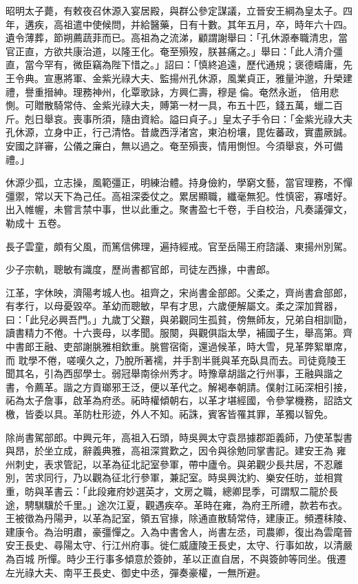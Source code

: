 \begin{pinyinscope}
 昭明太子薨，有敕夜召休源入宴居殿，與群公參定謀議，立晉安王綱為皇太子。四年，遘疾，高祖遣中使候問，并給醫藥，日有十數。其年五月，卒，時年六十四。遺令薄葬，節朔薦蔬菲而已。高祖為之流涕，顧謂謝舉曰：「孔休源奉職清忠，當官正直，方欲共康治道，以隆王化。奄至殞歿，朕甚痛之。」舉曰：「此人清介彊直，當今罕有，微臣竊為陛下惜之。」詔曰：「慎終追遠，歷代通規；褒德疇庸，先王令典。宣惠將軍、金紫光祿大夫、監揚州孔休源，風業貞正，雅量沖邈，升榮建禮，譽重搢紳。理務神州，化覃歌詠，方興仁壽，穆是倫。奄然永逝，
 倍用悲惻。可贈散騎常侍、金紫光祿大夫，賻第一材一具，布五十匹，錢五萬，蠟二百斤。剋日舉哀。喪事所須，隨由資給。謚曰貞子。」皇太子手令曰：「金紫光祿大夫孔休源，立身中正，行己清恪。昔歲西浮渚宮，東泊枌壤，毘佐蕃政，實盡厥誠。安國之詳審，公儀之廉白，無以過之。奄至殞喪，情用惻怛。今須舉哀，外可備禮。」



 休源少孤，立志操，風範彊正，明練治體。持身儉約，學窮文藝，當官理務，不憚彊禦，常以天下為己任。高祖深委仗之。累居顯職，纖毫無犯。性慎密，寡嗜好。出入帷幄，未嘗言禁中事，世以此重之。聚書盈七千卷，手自校治，凡奏議彈文，勒成十
 五卷。



 長子雲童，頗有父風，而篤信佛理，遍持經戒。官至岳陽王府諮議、東揚州別駕。



 少子宗軌，聰敏有識度，歷尚書都官郎，司徒左西掾，中書郎。



 江革，字休映，濟陽考城人也。祖齊之，宋尚書金部郎。父柔之，齊尚書倉部郎，有孝行，以母憂毀卒。革幼而聰敏，早有才思，六歲便解屬文。柔之深加賞器，曰：「此兒必興吾門。」九歲丁父艱，與弟觀同生孤貧，傍無師友，兄弟自相訓勖，讀書精力不倦。十六喪母，以孝聞。服闋，與觀俱詣太學，補國子生，舉高第。齊中書郎王融、吏部謝朓雅相欽重。朓嘗宿衛，還過候革，時大雪，見革弊絮單席，而
 耽學不倦，嗟嘆久之，乃脫所著襦，并手割半氈與革充臥具而去。司徒竟陵王聞其名，引為西邸學士。弱冠舉南徐州秀才。時豫章胡諧之行州事，王融與諧之書，令薦革。諧之方貢瑯邪王泛，便以革代之。解褐奉朝請。僕射江祏深相引接，祏為太子詹事，啟革為府丞。祏時權傾朝右，以革才堪經國，令參掌機務，詔誥文檄，皆委以具。革防杜形迹，外人不知。祏誅，賓客皆罹其罪，革獨以智免。



 除尚書駕部郎。中興元年，高祖入石頭，時吳興太守袁昂據郡距義師，乃使革製書與昂，於坐立成，辭義典雅，高祖深賞歎之，因令與徐勉同掌書記。建安王為
 雍州刺史，表求管記，以革為征北記室參軍，帶中廬令。與弟觀少長共居，不忍離別，苦求同行，乃以觀為征北行參軍，兼記室。時吳興沈約、樂安任昉，並相賞重，昉與革書云：「此段雍府妙選英才，文房之職，總卿昆季，可謂馭二龍於長途，騁騏驥於千里。」途次江夏，觀遇疾卒。革時在雍，為府王所禮，款若布衣。王被徵為丹陽尹，以革為記室，領五官掾，除通直散騎常侍，建康正。頻遷秣陵、建康令。為治明肅，豪彊憚之。入為中書舍人，尚書左丞，司農卿，復出為雲麾晉安王長史、尋陽太守、行江州府事。徙仁威廬陵王長史，太守、行事如故，以清嚴為百城
 所憚。時少王行事多傾意於簽帥，革以正直自居，不與簽帥等同坐。俄遷左光祿大夫、南平王長史、御史中丞，彈奏豪權，一無所避。




\end{pinyinscope}
